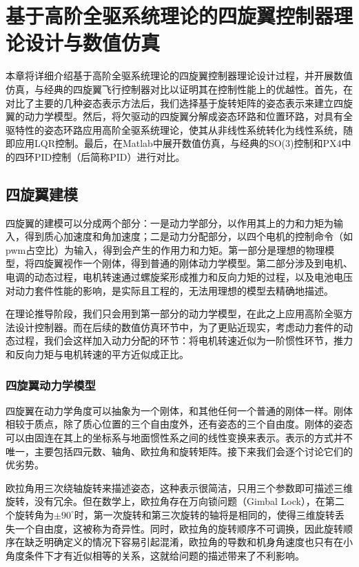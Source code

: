 \chapter{基于高阶全驱系统理论的四旋翼控制器理论设计与数值仿真}  
本章将详细介绍基于高阶全驱系统理论的四旋翼控制器理论设计过程，并开展数值仿真，与经典的四旋翼飞行控制器对比以证明其在控制性能上的优越性。首先，在对比了主要的几种姿态表示方法后，我们选择基于旋转矩阵的姿态表示来建立四旋翼的动力学模型。然后，将欠驱动的四旋翼分解成姿态环路和位置环路，对具有全驱特性的姿态环路应用高阶全驱系统理论，使其从非线性系统转化为线性系统，随即应用LQR控制。最后，在Matlab中展开数值仿真，与经典的SO(3)控制和PX4中的四环PID控制（后简称PID）进行对比。

\section{四旋翼建模}
四旋翼的建模可以分成两个部分：一是动力学部分，以作用其上的力和力矩为输入，得到质心加速度和角加速度；二是动力分配部分，以四个电机的控制命令（如pwm占空比）为输入，得到会产生的作用力和力矩。第一部分是理想的物理模型，将四旋翼视作一个刚体，得到普通的刚体动力学模型。第二部分涉及到电机、电调的动态过程，电机转速通过螺旋桨形成推力和反向力矩的过程，以及电池电压对动力套件性能的影响，是实际且工程的，无法用理想的模型去精确地描述。

在理论推导阶段，我们只会用到第一部分的动力学模型，在此之上应用高阶全驱方法设计控制器。而在后续的数值仿真环节中，为了更贴近现实，考虑动力套件的动态过程，我们会这样加入动力分配的环节：将电机转速近似为一阶惯性环节，推力和反向力矩与电机转速的平方近似成正比。

\subsection*{四旋翼动力学模型}
四旋翼在动力学角度可以抽象为一个刚体，和其他任何一个普通的刚体一样。刚体相较于质点，除了质心位置的三个自由度外，还有姿态的三个自由度。刚体的姿态可以由固连在其上的坐标系与地面惯性系之间的线性变换来表示。表示的方式并不唯一，主要包括四元数、轴角、欧拉角和旋转矩阵\cite{attitude}。接下来我们会逐个讨论它们的优劣势。


欧拉角用三次绕轴旋转来描述姿态，这种表示很简洁，只用三个参数即可描述三维旋转，没有冗余。但在数学上，欧拉角存在万向锁问题（Gimbal Lock），在第二个旋转角为$\pm 90^{\circ}$时，第一次旋转和第三次旋转的轴将是相同的，使得三维旋转丢失一个自由度，这被称为奇异性。同时，欧拉角的旋转顺序不可调换，因此旋转顺序在缺乏明确定义的情况下容易引起混淆，欧拉角的导数和机身角速度也只有在小角度条件下才有近似相等的关系，这就给问题的描述带来了不利影响。

